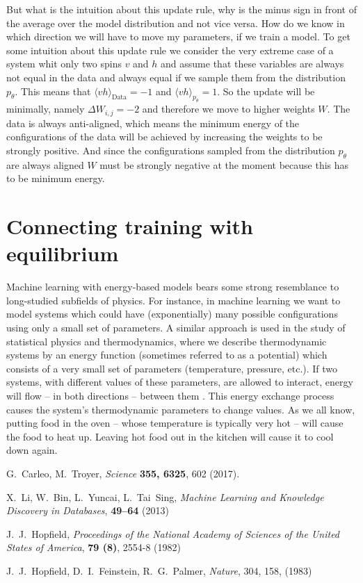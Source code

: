 \documentclass[nofootinbib, superscriptaddress, prl]{revtex4}
\begin{document}
But what is the intuition about this update rule, why is the minus sign in front of the average over the model distribution and not vice versa. How do we know in which direction we will have to move my parameters, if we train a model.
To get some intuition about this update rule we consider the very extreme case of a system whit only two spins $v$ and $h$ and assume that these variables are always not equal in the data and always equal if we sample them from the distribution $p_{\theta}$. This means that $\langle v h \rangle_{\text{Data}} = -1$
 and $\langle v h \rangle_{p_{\theta}}  = 1$. So the update will be minimally, namely $\Delta W_{i,j} = -2$ and therefore we move to higher weights $W$. The data is always anti-aligned, which means the minimum energy of the configurations of the data will be achieved by increasing the weights to be strongly positive. And since the configurations sampled from the distribution $p_{\theta}$ are always aligned $W$ must be strongly negative at the moment because this has to be minimum energy.
 

 
\section{Connecting training with equilibrium}

Machine learning with energy-based models bears some strong resemblance to long-studied subfields of physics. For instance, in machine learning we want to model systems which could have (exponentially) many possible configurations using only a small set of parameters. A similar approach is used in the study of statistical physics and thermodynamics, where we describe thermodynamic systems by an energy function (sometimes referred to as a potential) which consists of a very small set of parameters (temperature, pressure, etc.). If two systems, with different values of these parameters, are allowed to interact, energy will flow -- in both directions -- between them . This energy exchange process causes the system's thermodynamic parameters to change values. As we all know, putting food in the oven -- whose temperature is typically very hot -- will cause the food to heat up. Leaving hot food out in the kitchen will cause it to cool down again. 




 
\begin{thebibliography}{10}

G.~Carleo, M.~Troyer, {\it Science\/} {\bf 355, 6325}, 602
  (2017).

X.~Li, W.~Bin, L.~Yuncai, L.~Tai~Sing, {\it Machine Learning and Knowledge Discovery in Databases}, {\bf 49--64} (2013)

J.~J.~Hopfield, {\it Proceedings of the National Academy of Sciences of the United States of America}, {\bf 79 (8)}, 2554-8 (1982) 

J.~J.~Hopfield, D.~I.~Feinstein, R.~G.~Palmer, {\it Nature}, {304}, 158, (1983)


\end{thebibliography} 
\end{document}
